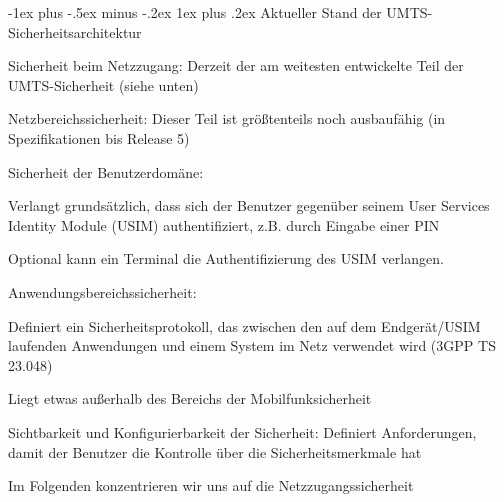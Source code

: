 \documentclass[a4paper]{article}
\makeatletter
\renewcommand{\subsubsection}{\@startsection{subsubsection}{3}{0mm}%
 {-1ex plus -.5ex minus -.2ex}%
 {1ex plus .2ex}%
 {\normalfont\small\bfseries}}
\makeatother
\begin{document}
\begin{multicols}{3}
      \subsubsection{Aktueller Stand der UMTS-Sicherheitsarchitektur}
      \begin{itemize*}
            \item Sicherheit beim Netzzugang: Derzeit der am weitesten entwickelte Teil
            der UMTS-Sicherheit (siehe unten)
            \item Netzbereichssicherheit: Dieser Teil ist größtenteils noch ausbaufähig
            (in Spezifikationen bis Release 5)
            \item Sicherheit der Benutzerdomäne:
            \begin{itemize*}
                  \item Verlangt grundsätzlich, dass sich der Benutzer gegenüber seinem User Services Identity Module (USIM) authentifiziert, z.B. durch Eingabe einer PIN
                  \item Optional kann ein Terminal die Authentifizierung des USIM verlangen.
            \end{itemize*}
            \item Anwendungsbereichssicherheit:
            \begin{itemize*}
                  \item Definiert ein Sicherheitsprotokoll, das zwischen den auf dem Endgerät/USIM laufenden Anwendungen und einem System im Netz verwendet wird (3GPP TS 23.048)
                  \item Liegt etwas außerhalb des Bereichs der Mobilfunksicherheit
            \end{itemize*}
            \item Sichtbarkeit und Konfigurierbarkeit der Sicherheit: Definiert
            Anforderungen, damit der Benutzer die Kontrolle über die
            Sicherheitsmerkmale hat
            \item Im Folgenden konzentrieren wir uns auf die Netzzugangssicherheit
      \end{itemize*}



\end{multicols}
\end{document}
